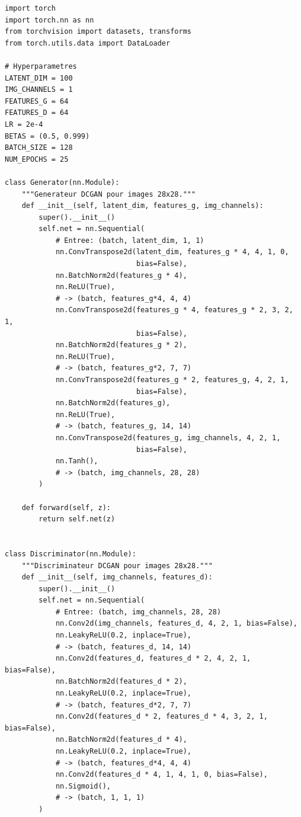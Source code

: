 \begin{codeblock}[title=\textbf{DCGAN complet avec boucle d'entra\^inement}]
\begin{verbatim}
import torch
import torch.nn as nn
from torchvision import datasets, transforms
from torch.utils.data import DataLoader

# Hyperparametres
LATENT_DIM = 100
IMG_CHANNELS = 1
FEATURES_G = 64
FEATURES_D = 64
LR = 2e-4
BETAS = (0.5, 0.999)
BATCH_SIZE = 128
NUM_EPOCHS = 25

class Generator(nn.Module):
    """Generateur DCGAN pour images 28x28."""
    def __init__(self, latent_dim, features_g, img_channels):
        super().__init__()
        self.net = nn.Sequential(
            # Entree: (batch, latent_dim, 1, 1)
            nn.ConvTranspose2d(latent_dim, features_g * 4, 4, 1, 0,
                               bias=False),
            nn.BatchNorm2d(features_g * 4),
            nn.ReLU(True),
            # -> (batch, features_g*4, 4, 4)
            nn.ConvTranspose2d(features_g * 4, features_g * 2, 3, 2, 1,
                               bias=False),
            nn.BatchNorm2d(features_g * 2),
            nn.ReLU(True),
            # -> (batch, features_g*2, 7, 7)
            nn.ConvTranspose2d(features_g * 2, features_g, 4, 2, 1,
                               bias=False),
            nn.BatchNorm2d(features_g),
            nn.ReLU(True),
            # -> (batch, features_g, 14, 14)
            nn.ConvTranspose2d(features_g, img_channels, 4, 2, 1,
                               bias=False),
            nn.Tanh(),
            # -> (batch, img_channels, 28, 28)
        )

    def forward(self, z):
        return self.net(z)


class Discriminator(nn.Module):
    """Discriminateur DCGAN pour images 28x28."""
    def __init__(self, img_channels, features_d):
        super().__init__()
        self.net = nn.Sequential(
            # Entree: (batch, img_channels, 28, 28)
            nn.Conv2d(img_channels, features_d, 4, 2, 1, bias=False),
            nn.LeakyReLU(0.2, inplace=True),
            # -> (batch, features_d, 14, 14)
            nn.Conv2d(features_d, features_d * 2, 4, 2, 1, bias=False),
            nn.BatchNorm2d(features_d * 2),
            nn.LeakyReLU(0.2, inplace=True),
            # -> (batch, features_d*2, 7, 7)
            nn.Conv2d(features_d * 2, features_d * 4, 3, 2, 1, bias=False),
            nn.BatchNorm2d(features_d * 4),
            nn.LeakyReLU(0.2, inplace=True),
            # -> (batch, features_d*4, 4, 4)
            nn.Conv2d(features_d * 4, 1, 4, 1, 0, bias=False),
            nn.Sigmoid(),
            # -> (batch, 1, 1, 1)
        )


\end{verbatim}
\end{codeblock}
